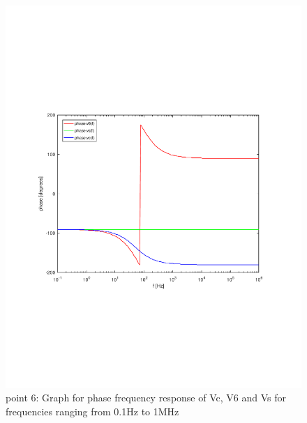 \begin{figure}[h!] \centering
\includegraphics[width=0.9\linewidth]{angle_tab.pdf}
\caption{point 6: Graph for phase frequency response of Vc, V6 and Vs for frequencies ranging from 0.1Hz to 1MHz}
\label{fig:angle_resp}
\end{figure}

\vspace{15cm}



